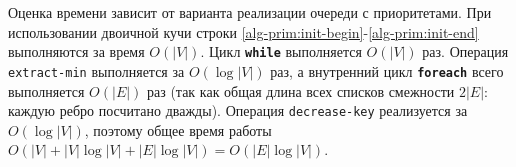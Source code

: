 Оценка времени зависит от варианта реализации очереди с приоритетами. При использовании двоичной кучи строки \ref{alg-prim:init-begin}-\ref{alg-prim:init-end} выполняются за время $O(|V|)$. Цикл {\tt\bf while} выполняется $O(|V|)$ раз. Операция \texttt{extract-min} выполняется за $O(\log |V|)$  раз, а внутренний цикл {\tt\bf foreach} всего выполняется $O(|E|)$ раз (так как общая длина всех списков смежности $2|E|$: каждую ребро посчитано дважды). Операция \texttt{decrease-key} реализуется за $O(\log|V|)$, поэтому общее время работы $O(|V|+|V|\log|V|+|E|\log|V|)=O(|E|\log|V|)$.
